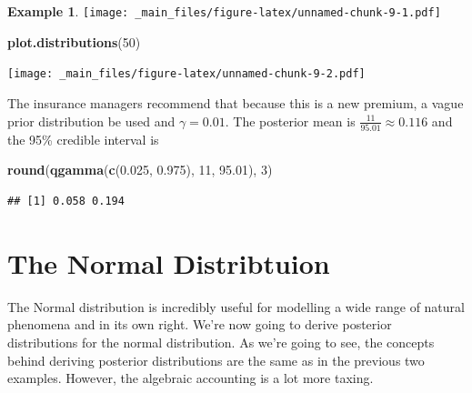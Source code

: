\documentclass[
]{book}
\newenvironment{Shaded}{\begin{snugshade}}{\end{snugshade}}
\newcommand{\DecValTok}[1]{\textcolor[rgb]{0.00,0.00,0.81}{#1}}
\newcommand{\FloatTok}[1]{\textcolor[rgb]{0.00,0.00,0.81}{#1}}
\newcommand{\FunctionTok}[1]{\textcolor[rgb]{0.13,0.29,0.53}{\textbf{#1}}}
\newcommand{\NormalTok}[1]{#1}
\theoremstyle{definition}
\theoremstyle{definition}
\newtheorem{example}{Example}[chapter]
\theoremstyle{definition}
\theoremstyle{definition}
\theoremstyle{remark}
\begin{document}
\begin{example}
\texttt{[image: \_main\_files/figure-latex/unnamed-chunk-9-1.pdf]}

\begin{Shaded}
\begin{Highlighting}[]
\FunctionTok{plot.distributions}\NormalTok{(}\DecValTok{50}\NormalTok{)}
\end{Highlighting}
\end{Shaded}

\texttt{[image: \_main\_files/figure-latex/unnamed-chunk-9-2.pdf]}

The insurance managers recommend that because this is a new premium, a vague prior distribution be used and \(\gamma = 0.01\). The posterior mean is \(\frac{11}{95.01} \approx 0.116\) and the 95\% credible interval is

\begin{Shaded}
\begin{Highlighting}[]
\FunctionTok{round}\NormalTok{(}\FunctionTok{qgamma}\NormalTok{(}\FunctionTok{c}\NormalTok{(}\FloatTok{0.025}\NormalTok{, }\FloatTok{0.975}\NormalTok{), }\DecValTok{11}\NormalTok{, }\FloatTok{95.01}\NormalTok{), }\DecValTok{3}\NormalTok{)}
\end{Highlighting}
\end{Shaded}

\begin{verbatim}
## [1] 0.058 0.194
\end{verbatim}

\end{example}

\hypertarget{the-normal-distribtuion}{%
\section{The Normal Distribtuion}\label{the-normal-distribtuion}}

The Normal distribution is incredibly useful for modelling a wide range of natural phenomena and in its own right. We're now going to derive posterior distributions for the normal distribution. As we're going to see, the concepts behind deriving posterior distributions are the same as in the previous two examples. However, the algebraic accounting is a lot more taxing.
\end{document}
